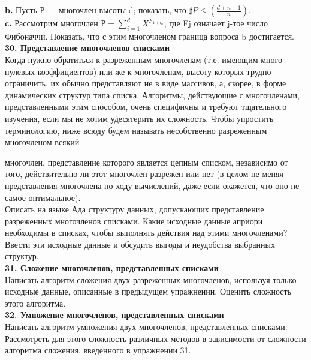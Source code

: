 \documentclass{mai_book}
\begin{document}
\textbf{b.} Пусть Р — многочлен высоты d; показать, что $\sharp P \leqslant (\frac{d+n-1}{n})$.\\

\textbf{c.} Рассмотрим многочлен $Р = \sum^{d}_{i=1} X^{F_{1+i_{n}}}$, где Fj означает j-тое число Фибоначчи. Показать, что с этим многочленом граница вопроса b достигается.\\

\noindent
\textbf{30. Представление многочленов списками}\\

Когда нужно обратиться к разреженным многочленам (т.е. имеющим много нулевых коэффициентов) или же к многочленам, высоту которых трудно ограничить, их обычно представляют не в виде массивов, а, скорее, в форме динамических структур типа списка. Алгоритмы, действующие с многочленами, представленными этим способом, очень специфичны и требуют тщательного изучения, если мы не хотим удесятерить их сложность. Чтобы упростить терминологию, ниже всюду будем называть несобственно разреженным многочленом всякий

\newpage

\noindent
многочлен, представление которого является цепным списком, независимо от того, действительно ли этот многочлен разрежен или нет (в целом не меняя представления многочлена по ходу вычислений, даже если окажется, что оно не самое оптимальное).\\

Описать на языке Ада структуру данных, допускающих представление разреженных многочленов списками. Какие исходные данные априори необходимы в списках, чтобы выполнять действия над этими многочленами? Ввести эти исходные данные и обсудить выгоды и неудобства выбранных структур.\\

\noindent
\textbf{31. Сложение многочленов, представленных списками}\\

\noindent
Написать алгоритм сложения двух разреженных многочленов, используя только исходные данные, описанные в предыдущем упражнении. Оценить сложность этого алгоритма.\\

\noindent
\textbf{32. Умножение многочленов, представленных списками}\\

Написать алгоритм умножения двух многочленов, представленных списками. Рассмотреть для этого сложность различных методов в зависимости от сложности алгоритма сложения, введенного в упражнении 31.\\
\end{document}
